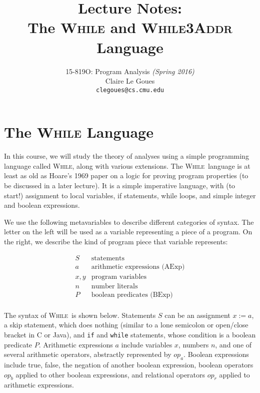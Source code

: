 \documentclass[11pt]{article}
\title{Lecture Notes:\\
The \textsc{While} and \textsc{While3Addr} Language}
\author{15-819O: Program Analysis \emph{(Spring 2016)} \\
        Claire Le Goues \\
		{\tt clegoues@cs.cmu.edu}}
\date{}
\def\While{\textsc{While}}
\begin{document}
\newtheorem{theorem}{Theorem}
\newtheorem{lemma}[theorem]{Lemma}

\maketitle

\section{The \textsc{While} Language}

In this course, we will study the theory of analyses using a simple
programming language called \While, along with various extensions.
The \While~language is at least as old as Hoare's 1969 paper on
a logic for proving program properties (to be discussed in a later lecture).
It is a simple imperative language, with (to start!) assignment to local variables,
if statements, while loops, and simple integer and boolean expressions.

We use the following metavariables to describe different
categories of syntax.  The letter on the left will be used as a variable
representing a piece of a program. On the right, we describe the kind
of program piece that variable represents:

\[
\begin{array}{ll}
S   & \mbox{statements}\\
a   & \mbox{arithmetic expressions (AExp)}\\
x,y & \mbox{program variables}\\
n   & \mbox{number literals}\\
P   & \mbox{boolean predicates (BExp)}\\
\end{array}
\]


The syntax of \While~is shown below.  Statements $S$ can be an
assignment $x := a$, a skip statement, which does nothing (similar to
a lone semicolon or open/close bracket in C or Java), and \texttt{if} and \texttt{while}
statements, whose condition is a boolean predicate $P$.  Arithmetic
expressions $a$ include variables $x$, numbers $n$, and one of several
arithmetic operators, abstractly represented by $op_a$.  Boolean
expressions include true, false, the negation of another boolean
expression, boolean operators $op_b$ applied to other boolean
expressions, and relational operators $op_r$ applied to arithmetic
expressions.
\end{document}
